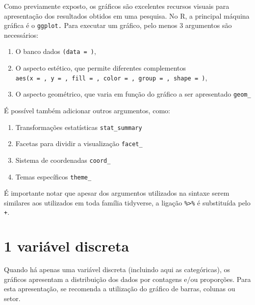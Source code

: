 \documentclass[
]{book}
\providecommand{\tightlist}{%
  \setlength{\itemsep}{0pt}\setlength{\parskip}{0pt}}
\begin{document}
Como previamente exposto, os gráficos são excelentes recursos visuais para apresentação dos resultados obtidos em uma pesquisa. No R, a principal máquina gráfica é o \texttt{ggplot.} Para executar um gráfico, pelo menos 3 argumentos são necessários:

\begin{enumerate}
\def\labelenumi{\arabic{enumi}.}
\tightlist
\item
  O banco dados \texttt{(data\ =\ )},\\
\item
  O aspecto estético, que permite diferentes complementos \texttt{aes(x\ =\ ,\ y\ =\ ,\ fill\ =\ ,\ color\ =\ ,\ group\ =\ ,\ shape\ =\ )},\\
\item
  O aspecto geométrico, que varia em função do gráfico a ser apresentado \texttt{geom\_}
\end{enumerate}

É possível também adicionar outros argumentos, como:

\begin{enumerate}
\def\labelenumi{\arabic{enumi}.}
\setcounter{enumi}{3}
\tightlist
\item
  Transformações estatísticas \texttt{stat\_summary}\\
\item
  Facetas para dividir a visualização \texttt{facet\_}\\
\item
  Sistema de coordenadas \texttt{coord\_}\\
\item
  Temas específicos \texttt{theme\_}
\end{enumerate}

É importante notar que apesar dos argumentos utilizados na sintaxe serem similares aos utilizados em toda família tidyverse, a ligação \texttt{\%\textgreater{}\%} é substituída pelo \texttt{+}.

\hypertarget{variuxe1vel-discreta}{%
\section{1 variável discreta}\label{variuxe1vel-discreta}}

Quando há apenas uma variável discreta (incluindo aqui as categóricas), os gráficos apresentam a distribuição dos dados por contagens e/ou proporções. Para esta apresentação, se recomenda a utilização do gráfico de barras, colunas ou setor.
\end{document}
